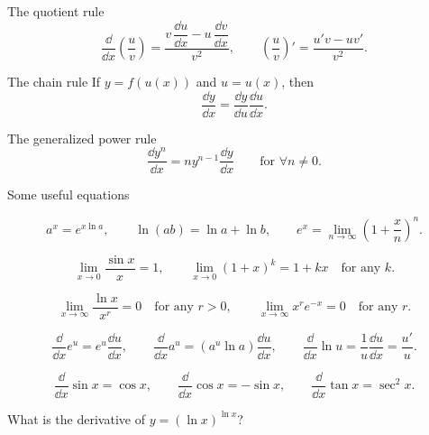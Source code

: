 \begin{concept}{The quotient rule}
\[
\frac{\dd}{\dd x}\left(\frac{u}{v}\right)
=\frac{v\,\dfrac{\dd u}{\dd x}-u\,\dfrac{\dd v}{\dd x}}{v^2},
\qquad
\left(\frac{u}{v}\right)'=\frac{u'v-uv'}{v^2}.
\]
\end{concept}

\begin{concept}{The chain rule}
If $y=f(u(x))$ and $u=u(x)$, then
\[
\frac{\dd y}{\dd x}=\frac{\dd y}{\dd u}\frac{\dd u}{\dd x}.
\]
\end{concept}

\begin{concept}{The generalized power rule}
\[
\frac{\dd y^n}{\dd x}=ny^{n-1}\frac{\dd y}{\dd x}\qquad\text{for }\forall n\ne0.
\]
\end{concept}

\begin{concept}{Some useful equations}

\[
a^x=e^{x\ln a},
\qquad \ln(ab)=\ln a+\ln b,
\qquad e^x=\lim_{n\to\infty}\left(1+\frac{x}{n}\right)^n.
\]

\[
\lim_{x\to0}\frac{\sin x}{x}=1,
\qquad
\lim_{x\to0}(1+x)^k=1+kx\quad\text{for any }k.
\]

\[
\lim_{x\to\infty}\frac{\ln x}{x^r}=0\quad\text{for any }r>0,
\qquad
\lim_{x\to\infty}x^r e^{-x}=0\quad\text{for any }r.
\]

\[
\frac{\dd}{\dd x}e^u=e^u\frac{\dd u}{\dd x},
\qquad
\frac{\dd}{\dd x}a^u=(a^u\ln a)\frac{\dd u}{\dd x},
\qquad
\frac{\dd}{\dd x}\ln u=\frac{1}{u}\frac{\dd u}{\dd x}=\frac{u'}{u}.
\]

\[
\frac{\dd}{\dd x}\sin x=\cos x,
\qquad
\frac{\dd}{\dd x}\cos x=-\sin x,
\qquad
\frac{\dd}{\dd x}\tan x=\sec^2 x.
\]
\end{concept}

\begin{problem}{What is the derivative of $y=(\ln x)^{\ln x}$?}
\end{problem}

